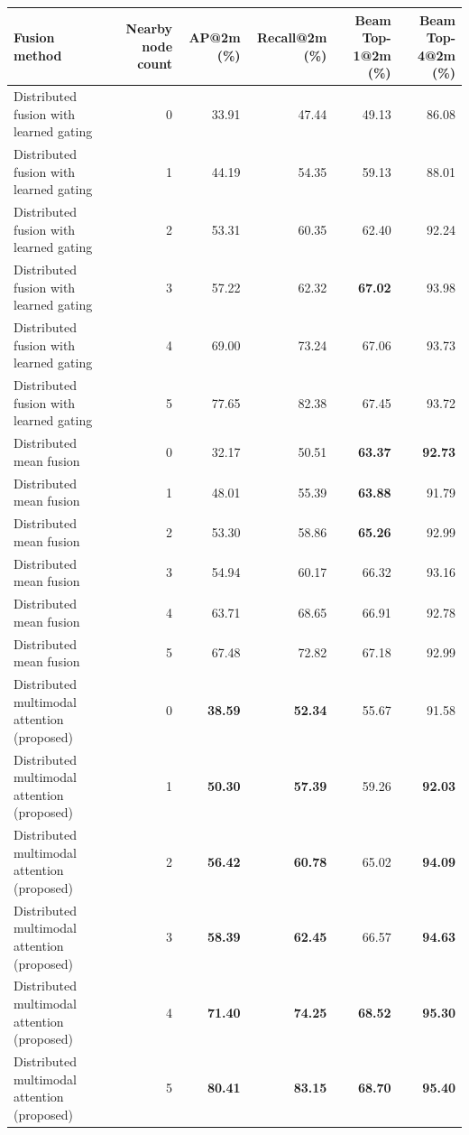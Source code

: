 \begin{tabular}{lrrrrr}
\toprule
Fusion method & Nearby node count & AP@2m (\%) & Recall@2m (\%) & Beam Top-1@2m (\%) & Beam Top-4@2m (\%) \\
\midrule
Distributed fusion with learned gating & 0 & 33.91 & 47.44 & 49.13 & 86.08 \\
Distributed fusion with learned gating & 1 & 44.19 & 54.35 & 59.13 & 88.01 \\
Distributed fusion with learned gating & 2 & 53.31 & 60.35 & 62.40 & 92.24 \\
Distributed fusion with learned gating & 3 & 57.22 & 62.32 & \textbf{67.02} & 93.98 \\
Distributed fusion with learned gating & 4 & 69.00 & 73.24 & 67.06 & 93.73 \\
Distributed fusion with learned gating & 5 & 77.65 & 82.38 & 67.45 & 93.72 \\
Distributed mean fusion & 0 & 32.17 & 50.51 & \textbf{63.37} & \textbf{92.73} \\
Distributed mean fusion & 1 & 48.01 & 55.39 & \textbf{63.88} & 91.79 \\
Distributed mean fusion & 2 & 53.30 & 58.86 & \textbf{65.26} & 92.99 \\
Distributed mean fusion & 3 & 54.94 & 60.17 & 66.32 & 93.16 \\
Distributed mean fusion & 4 & 63.71 & 68.65 & 66.91 & 92.78 \\
Distributed mean fusion & 5 & 67.48 & 72.82 & 67.18 & 92.99 \\
Distributed multimodal attention (proposed) & 0 & \textbf{38.59} & \textbf{52.34} & 55.67 & 91.58 \\
Distributed multimodal attention (proposed) & 1 & \textbf{50.30} & \textbf{57.39} & 59.26 & \textbf{92.03} \\
Distributed multimodal attention (proposed) & 2 & \textbf{56.42} & \textbf{60.78} & 65.02 & \textbf{94.09} \\
Distributed multimodal attention (proposed) & 3 & \textbf{58.39} & \textbf{62.45} & 66.57 & \textbf{94.63} \\
Distributed multimodal attention (proposed) & 4 & \textbf{71.40} & \textbf{74.25} & \textbf{68.52} & \textbf{95.30} \\
Distributed multimodal attention (proposed) & 5 & \textbf{80.41} & \textbf{83.15} & \textbf{68.70} & \textbf{95.40} \\
\bottomrule
\end{tabular}
